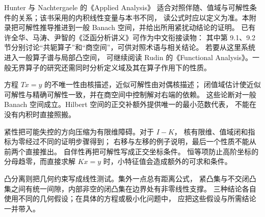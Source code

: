 Hunter 与 Nachtergaele 的《Applied Analysis》\cite[Section 8.3]{Hunter2001Applied}
适合对照伴随、值域与可解性条件的关系；该书采用的内积线性变量与本书不同，
读公式时应以定义为准。本附录把可解性推导推进到一般 Banach 空间，并给出所用紧扰动结论的证明。
已有许全华、马涛、尹智的《泛函分析讲义》\cite{Xu2017Fanhan}可作为中文衔接读物：
其中第 9.1、9.2 节分别讨论“共轭算子”和“商空间”，可供对照术语与相关结论。
若要从这里系统进入一般算子谱与局部凸空间，
可继续阅读 Rudin 的《Functional Analysis》\cite{Rudin1991Functional}。一般无界算子的研究还需同时分析定义域及其在算子作用下的性质。








\begin{chaptersummary}
方程 \(Tx=y\) 的不唯一性由核描述，近似可解性由对偶核描述；
闭值域估计使近似可解性与精确可解性一致，并在商空间中控制解对右端的依赖。
这些论断对一般 Banach 空间成立。Hilbert 空间的正交补额外提供唯一的最小范数代表，
不能在没有内积时直接照搬。

\ProseParagraphBreak

紧性把可能失控的方向压缩为有限维障碍。对于 \(I-K\)，
核有限维、值域闭和指标为零经过不同的证明步骤得到；
右移与左移的例子说明，最后一个性质不能从前两个直接推出。
自伴性再把可解性写成正交坐标条件。
恒等项防止高阶坐标的分母趋零，而直接求解 \(Kx=y\) 时，小特征值会造成额外的可求和条件。

\ProseParagraphBreak

凸分离则把几何约束写成线性测试。集外一点总有距离公式，
紧凸集与不交闭凸集之间有统一间隙，内部非空的闭凸集在边界处有非零线性支撑。
三种结论各自使用不同的几何假设；在具体的方程或极小化问题中，
应把这些假设与所需结论一并带入。
\end{chaptersummary}

\BookExercises


